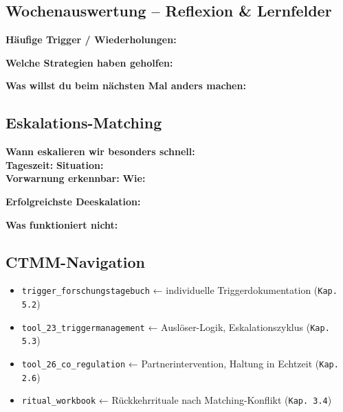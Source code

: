\subsection*{\textcolor{ctmmGreen}{Wochenauswertung -- Reflexion \& Lernfelder}}

\begin{tcolorbox}[colback=ctmmGreen!5!white,colframe=ctmmGreen,title=Welche Muster wiederholen sich? Was willst du nächste Woche ausprobieren?]

\textbf{Häufige Trigger / Wiederholungen:}\\

\textbf{Welche Strategien haben geholfen:}\\

\textbf{Was willst du beim nächsten Mal anders machen:}\\

\end{tcolorbox}

\subsection*{\textcolor{ctmmRed}{Eskalations-Matching}}

\textbf{Wann eskalieren wir besonders schnell:}\\
\textbf{Tageszeit:}  \quad \textbf{Situation:} \\
\textbf{Vorwarnung erkennbar:}  \quad \textbf{Wie:} 

\textbf{Erfolgreichste Deeskalation:}\\

\textbf{Was funktioniert nicht:}\\

\subsection*{\textcolor{ctmmBlue}{CTMM-Navigation}}

\begin{itemize}
  \item \texttt{trigger\_forschungstagebuch} ← individuelle Triggerdokumentation (\texttt{Kap. 5.2})
  \item \texttt{tool\_23\_triggermanagement} ← Auslöser-Logik, Eskalationszyklus (\texttt{Kap. 5.3})
  \item \texttt{tool\_26\_co\_regulation} ← Partnerintervention, Haltung in Echtzeit (\texttt{Kap. 2.6})
  \item \texttt{ritual\_workbook} ← Rückkehrrituale nach Matching-Konflikt (\texttt{Kap. 3.4})
\end{itemize}

